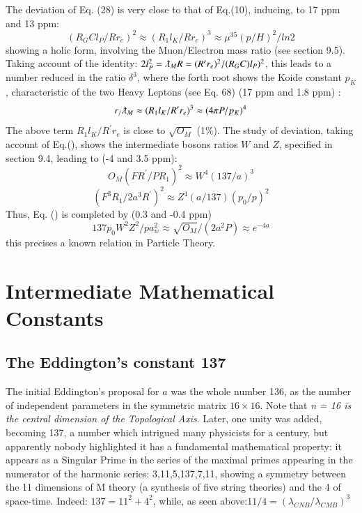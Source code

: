 \documentclass[twoside,draft]{article}
\begin{document}
\begin{sloppypar}
The deviation of Eq. (28) is very close to that of Eq.(10), inducing, to 17 ppm and 13 ppm: 
\begin{equation}
 (R_G{C}l_P/Rr_e)^2 \approx (R_1l_K/Rr_e)^3 \approx \mu^{35}(p/H)^2/ln2
\end{equation}
showing a holic form, involving the Muon/Electron mass ratio (see section 9.5).
Taking account of the identity: $2l_P^2 = \lambdabar_M R = (R^{\prime}r_e)^2/(R_GC)l_P)^2$, this leads to a number reduced in the ratio $\delta^3$, where the forth root shows the Koide constant $p_K$, characteristic of the two Heavy Leptons (see Eq. 68) (17 ppm and 1.8 ppm) :
\begin{equation}
r_/\lambdabar_M \approx (R_1l_K/R^{\prime}r_e)^3 \approx (4\pi P/p_K)^4
\end{equation}
The above term $R_1l_K/R^{\prime}r_e$ is close to $\sqrt{O_M}$ (1\%). The study of deviation, taking account of Eq.(), shows the intermediate bosons ratios $W$ and $Z$, specified in section 9.4, leading to (-4 and 3.5 ppm):
\begin{equation}
O_M (FR^{\prime}/PR_1)^2 \approx W^4 (137/a)^3
\end{equation}
\begin{equation}
 (F^3R_1 / 2 a^3R^{\prime})^2 \approx Z^4 (a/137)(p_0/p)^2
\end{equation}
Thus, Eq. () is completed by (0.3 and -0.4 ppm)
\begin{equation}
137 p_0 W^2 Z^2/p a_w^2 \approx \sqrt{O_M}/(2a^2 P) \approx e^{-4a}
\end{equation}
this precises a known relation in Particle Theory.

\section{Intermediate Mathematical Constants}
\subsection{The Eddington's constant 137}

The initial Eddington's proposal for $a$ was the whole number 136, as the number of independent parameters in the symmetric matrix $16 \times 16$. Note that \textit{n = 16 is the central dimension of the Topological Axis}. Later, one unity was added, becoming 137, a number which intrigued many physicists for a century, but apparently nobody highlighted it has a fundamental mathematical property: it appears as a Singular Prime in the series of the maximal primes appearing in the numerator of the harmonic
series: 3,11,5,137,7,11, showing a symmetry between the 11 dimensions of M theory (a synthesis of five string theories) and the 4 of space-time. Indeed: $137 = 11^{2} + 4^{2}$, while, as seen above:$11/4 = (\lambda_{CNB}/\lambda_{CMB})^{3}$


\end{sloppypar}
\end{document}
